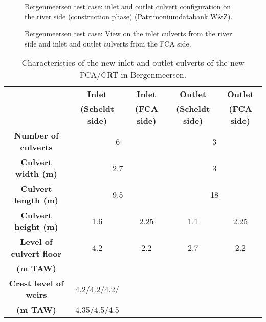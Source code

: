 \begin{figure}[H]
\begin{center}
\end{center}
\caption{Bergenmeersen test case: inlet and outlet culvert configuration on the river side (construction phase) (Patrimoniumdatabank W\&Z).}
\label{fig:bergenmeersen_figure2}
\end{figure}

\begin{figure}[H]
\begin{center}
\end{center}
\caption{Bergenmeersen test case: View on the inlet culverts from the river side and inlet and outlet culverts from the FCA side.}
\label{fig:bergenmeersen_figure3}
\end{figure}

\begin{table}[H]
\caption{Characteristics of the new inlet and outlet culverts of the new
FCA/CRT in Bergenmeersen.}\label{tab:bergenmeersen_table1}
\begin{center}\begin{tabular}{|c|c|c|c|c|}
\hline
~ & \textbf{Inlet} & \textbf{Inlet} & \textbf{Outlet} & \textbf{Outlet}\\
~ & \textbf{(Scheldt side)} & \textbf{(FCA side)} & \textbf{(Scheldt side)} & \textbf{(FCA side)}\\
\hline
\textbf{Number of culverts} & \multicolumn{2}{c|}{6} & \multicolumn{2}{c|}{3} \\
\hline
\textbf{Culvert width (m)} & \multicolumn{2}{c|}{2.7} & \multicolumn{2}{c|}{3} \\
\hline
\textbf{Culvert length (m)} & \multicolumn{2}{c|}{9.5} & \multicolumn{2}{c|}{18} \\
\hline
\textbf{Culvert height (m)} & 1.6 & 2.25 & 1.1 & 2.25\\
\hline
\textbf{Level of culvert floor} & 4.2 & 2.2 & 2.7 & 2.2\\
\textbf{(m TAW)} & ~ & ~ & ~ & ~\\
\hline
\textbf{Crest level of weirs} & 4.2/4.2/4.2/ & ~ & ~ & ~ \\
\textbf{(m TAW)} & 4.35/4.5/4.5 & ~ & ~ & ~ \\
\hline
\end{tabular}\end{center}
\end{table}

